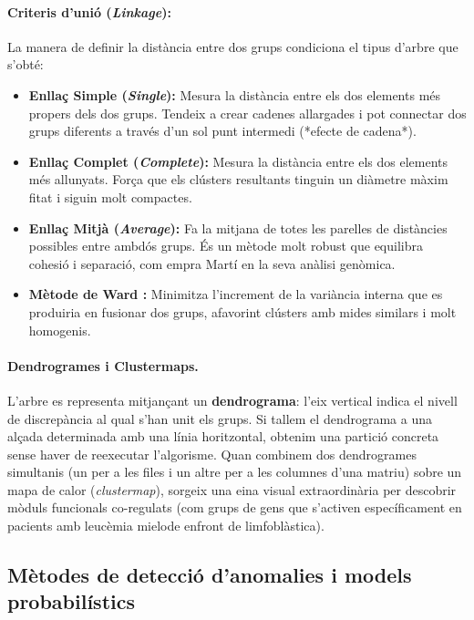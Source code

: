 \documentclass[a4paper,11pt]{article}
\begin{document}
\paragraph{Criteris d'unió (\emph{Linkage}):} La manera de definir la distància entre dos grups condiciona el tipus d'arbre que s'obté:
\begin{itemize}
    \item \textbf{Enllaç Simple (\emph{Single}):} Mesura la distància entre els dos elements més propers dels dos grups. Tendeix a crear cadenes allargades i pot connectar dos grups diferents a través d'un sol punt intermedi (*efecte de cadena*).
    \item \textbf{Enllaç Complet (\emph{Complete}):} Mesura la distància entre els dos elements més allunyats. Força que els clústers resultants tinguin un diàmetre màxim fitat i siguin molt compactes.
    \item \textbf{Enllaç Mitjà (\emph{Average}):} Fa la mitjana de totes les parelles de distàncies possibles entre ambdós grups. És un mètode molt robust que equilibra cohesió i separació, com empra Martí en la seva anàlisi genòmica.
    \item \textbf{Mètode de Ward \cite{ward1963}:} Minimitza l'increment de la variància interna que es produiria en fusionar dos grups, afavorint clústers amb mides similars i molt homogenis.
\end{itemize}

\paragraph{Dendrogrames i Clustermaps.} L'arbre es representa mitjançant un \textbf{dendrograma}: l'eix vertical indica el nivell de discrepància al qual s'han unit els grups. Si tallem el dendrograma a una alçada determinada amb una línia horitzontal, obtenim una partició concreta sense haver de reexecutar l'algorisme. Quan combinem dos dendrogrames simultanis (un per a les files i un altre per a les columnes d'una matriu) sobre un mapa de calor (\emph{clustermap}), sorgeix una eina visual extraordinària per descobrir mòduls funcionals co-regulats (com grups de gens que s'activen específicament en pacients amb leucèmia mielode enfront de limfoblàstica).

\subsection{Mètodes de detecció d'anomalies i models probabilístics}
\end{document}
